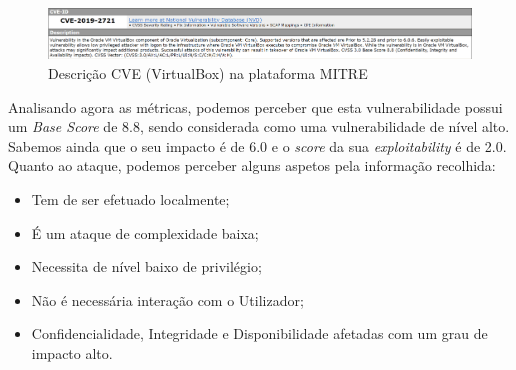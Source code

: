 \documentclass[11t]{article}
\begin{document}
\vspace{0.2cm}

\begin{figure}[H]
    \centering
    \includegraphics[width=\textwidth]{images/descricaoVirtualBox.png}
    \caption{Descrição CVE (VirtualBox) na plataforma MITRE}
\end{figure}

\vspace{0.4cm}

Analisando agora as métricas, podemos perceber que esta vulnerabilidade possui um \textit{Base Score} de 8.8, sendo considerada como uma vulnerabilidade de nível alto. Sabemos ainda que o seu impacto é de 6.0 e o \textit{score} da sua \textit{exploitability} é de 2.0. Quanto ao ataque, podemos perceber alguns aspetos pela informação recolhida:
\begin{itemize}
    \item Tem de ser efetuado localmente;
    \item É um ataque de complexidade baixa;
    \item Necessita de nível baixo de privilégio;
    \item Não é necessária interação com o Utilizador;
    \item Confidencialidade, Integridade e Disponibilidade afetadas com um grau de impacto alto.
\end{itemize}

\vspace{0.1cm}
\end{document}

